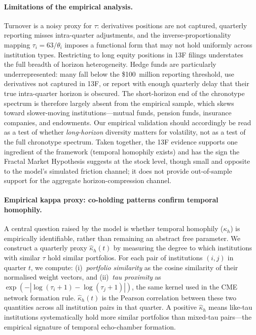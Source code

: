 \documentclass[preprint,12pt,authoryear]{elsarticle}
\begin{document}
\paragraph{Limitations of the empirical analysis.}
Turnover is a noisy proxy for $\tau$: derivatives positions are not
captured, quarterly reporting misses intra-quarter adjustments, and the
inverse-proportionality mapping $\tau_i = 63/\theta_i$ imposes a
functional form that may not hold uniformly across institution types.
Restricting to long equity positions in 13F filings understates the full
breadth of horizon heterogeneity.
Hedge funds are particularly underrepresented: many fall below the
\$100~million reporting threshold, use derivatives not captured in 13F,
or report with enough quarterly delay that their true intra-quarter
horizon is obscured.
The short-horizon end of the chronotype spectrum is therefore largely
absent from the empirical sample, which skews toward slower-moving
institutions---mutual funds, pension funds, insurance companies, and
endowments.
Our empirical validation should accordingly be read as a test of whether
\emph{long-horizon} diversity matters for volatility, not as a test of
the full chronotype spectrum.
Taken together, the 13F evidence supports one ingredient of the framework
(temporal homophily exists) and has the sign the Fractal Market Hypothesis
suggests at the stock level, though small and opposite to the model's simulated
friction channel; it does not provide out-of-sample support for the aggregate
horizon-compression channel.

\paragraph{Empirical kappa proxy: co-holding patterns confirm temporal homophily.}
A central question raised by the model is whether temporal homophily
($\kappa_h$) is empirically identifiable, rather than remaining an abstract
free parameter.
We construct a quarterly proxy $\hat{\kappa}_h(t)$ by measuring the
degree to which institutions with similar $\tau$ hold similar portfolios.
For each pair of institutions $(i,j)$ in quarter $t$, we compute:
(i)~\emph{portfolio similarity} as the cosine similarity of their
normalised weight vectors, and (ii)~\emph{tau proximity} as
$\exp(-|\log(\tau_i+1)-\log(\tau_j+1)|)$, the same kernel used in the
CME network formation rule.
$\hat{\kappa}_h(t)$ is the Pearson correlation between these two
quantities across all institution pairs in that quarter.
A positive $\hat{\kappa}_h$ means like-tau institutions systematically
hold more similar portfolios than mixed-tau pairs---the empirical
signature of temporal echo-chamber formation.
\end{document}
